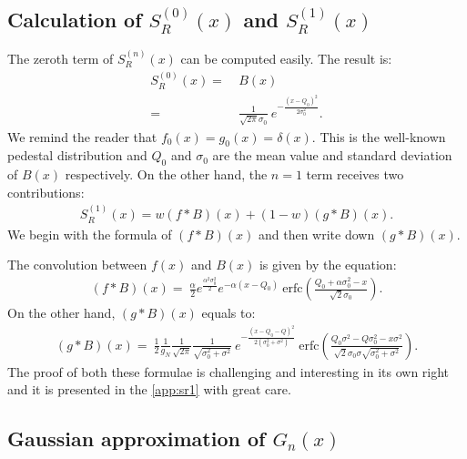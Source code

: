 \documentclass[preprint,12pt]{elsarticle}
\begin{document}
\subsection{Calculation of $S^{(0)}_R(x)$ and $S^{(1)}_R(x)$}
%

The zeroth term of $S^{(n)}_R(x)$ can be computed easily. 
The result is:
\begin{align}
S^{(0)}_R(x)  = \ & B(x) \nonumber \\
                      = \ & \frac{1}{\sqrt{2\pi}\sigma_0} \ e^{-\frac{(x-Q_0)^2}{2\sigma_0^2}}.
\end{align}
We remind the reader that $f_0(x)=g_0(x)=\delta (x)$. 
This is the well-known pedestal distribution and $Q_0$ and $\sigma_0$ are the mean value and standard deviation of $B(x)$ respectively. 
On the other hand, the $n=1$ term receives two contributions:
\begin{align}
S^{(1)}_R(x)  = w (f*B)(x) + (1-w)(g*B)(x). 
\end{align}                     
We begin with the formula of $(f*B)(x)$ and then write down $(g*B)(x)$.

The convolution between $f(x)$ and $B(x)$ is given by the equation:
\begin{align}
(f*B)(x)  = \ \frac{\alpha}{2} e^{\frac{\alpha^2\sigma_0^2}{2}} e^{-\alpha (x-Q_0)} \ \text{erfc}\left( \frac{Q_0 + \alpha\sigma_0^2 - x }{\sqrt{2}\sigma_0} \right).
\end{align}  
On the other hand, $(g*B)(x)$ equals to:
\begin{align}
(g*B)(x)  = \ \frac{1}{2}  \frac{1}{g_N}  \frac{1}{\sqrt{2\pi}} \frac{1}{\sqrt{\sigma_0^2 + \sigma^2}}   \ e^{ -\frac{ (x-Q_0-Q)^2 }{2(\sigma_0^2 + \sigma^2)}} 
\ \text{erfc}\left(  \frac{ Q_0\sigma^2 -Q\sigma_0^2 -x \sigma^2  }{\sqrt{2} \sigma_0\sigma\sqrt{\sigma_0^2 + \sigma^2} }   \right).
\end{align}  
The proof of both these formulae is challenging and interesting in its own right and it is presented in the \ref{app:sr1} with great care. 

\subsection{Gaussian approximation of $G_n(x)$}
%
\end{document}
